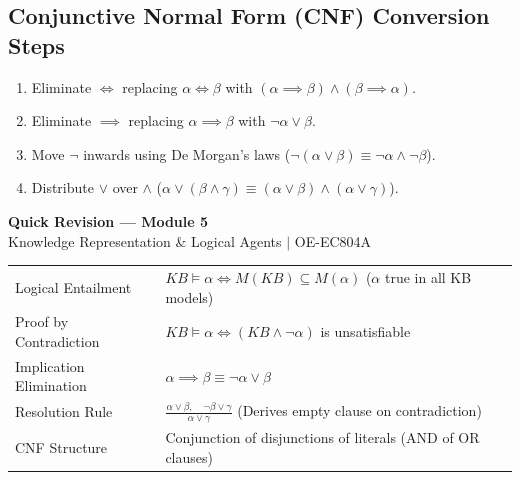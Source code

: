 \documentclass[12pt,a4paper]{article}
\renewcommand{\arraystretch}{1.45}
\begin{document}
\subsection{Conjunctive Normal Form (CNF) Conversion Steps}
\begin{enumerate}[leftmargin=*, itemsep=3pt]
  \item Eliminate $\iff$ replacing $\alpha \iff \beta$ with $(\alpha \implies \beta) \land (\beta \implies \alpha)$.
  \item Eliminate $\implies$ replacing $\alpha \implies \beta$ with $\neg \alpha \lor \beta$.
  \item Move $\neg$ inwards using De Morgan's laws ($\neg(\alpha \lor \beta) \equiv \neg \alpha \land \neg \beta$).
  \item Distribute $\lor$ over $\land$ ($\alpha \lor (\beta \land \gamma) \equiv (\alpha \lor \beta) \land (\alpha \lor \gamma)$).
\end{enumerate}

\newpage
\begin{center}
  {\large\bfseries\color{myred} Quick Revision --- Module 5}\\[3pt]
  {\small\color{mydark} Knowledge Representation \& Logical Agents $|$ OE-EC804A}
\end{center}
\noindent{\color{myred}\rule{\linewidth}{1.2pt}}
\vspace{4pt}

\begin{tcolorbox}[formulabox, title={\textbf{Key Concepts and Metrics at a Glance}}]
\renewcommand{\arraystretch}{1.35}
\begin{tabularx}{\linewidth}{B{4.5cm} X}
Logical Entailment & $KB \models \alpha \iff M(KB) \subseteq M(\alpha)$ \quad ($\alpha$ true in all KB models) \\[4pt]
Proof by Contradiction & $KB \models \alpha \iff (KB \land \neg \alpha)$ is unsatisfiable \\[4pt]
Implication Elimination & $\alpha \implies \beta \equiv \neg \alpha \lor \beta$ \\[4pt]
Resolution Rule & $\frac{\alpha \lor \beta, \quad \neg \beta \lor \gamma}{\alpha \lor \gamma}$ \quad (Derives empty clause on contradiction) \\[4pt]
CNF Structure & Conjunction of disjunctions of literals (AND of OR clauses) \\
\end{tabularx}
\end{tcolorbox}
\end{document}
